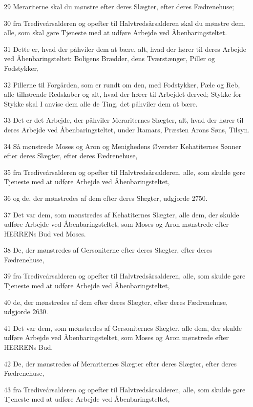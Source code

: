\par 29 Merariterne skal du mønstre efter deres Slægter, efter deres Fædrenehuse;
\par 30 fra Trediveårsalderen og opefter til Halvtredsårsalderen skal du mønstre dem, alle, som skal gøre Tjeneste med at udføre Arbejde ved Åbenbaringsteltet.
\par 31 Dette er, hvad der påhviler dem at bære, alt, hvad der hører til deres Arbejde ved Åbenbaringsteltet: Boligens Brædder, dens Tværstænger, Piller og Fodstykker,
\par 32 Pillerne til Forgården, som er rundt om den, med Fodstykker, Pæle og Reb, alle tilhørende Redskaber og alt, hvad der hører til Arbejdet derved; Stykke for Stykke skal I anvise dem alle de Ting, det påhviler dem at bære.
\par 33 Det er det Arbejde, der påhviler Merariternes Slægter, alt, hvad der hører til deres Arbejde ved Åbenbaringsteltet, under Itamars, Præsten Arons Søns, Tilsyn.
\par 34 Så mønstrede Moses og Aron og Menighedens Øverster Kehatiternes Sønner efter deres Slægter, efter deres Fædrenehuse,
\par 35 fra Trediveårsalderen og opefter til Halvtredsårsalderen, alle, som skulde gøre Tjeneste med at udføre Arbejde ved Åbenbaringsteltet,
\par 36 og de, der mønstredes af dem efter deres Slægter, udgjorde 2750.
\par 37 Det var dem, som mønstredes af Kehatiternes Slægter, alle dem, der skulde udføre Arbejde ved Åbenbaringsteltet, som Moses og Aron mønstrede efter HERRENs Bud ved Moses.
\par 38 De, der mønstredes af Gersoniterne efter deres Slægter, efter deres Fædrenehuse,
\par 39 fra Trediveårsalderen og opefter til Halvtredsårsalderen, alle, som skulde gøre Tjeneste med at udføre Arbejde ved Åbenbaringsteltet,
\par 40 de, der mønstredes af dem efter deres Slægter, efter deres Fædrenehuse, udgjorde 2630.
\par 41 Det var dem, som mønstredes af Gersoniternes Slægter, alle dem, der skulde udføre Arbejde ved Åbenbaringsteltet, som Moses og Aron mønstrede efter HERRENs Bud.
\par 42 De, der mønstredes af Merariternes Slægter efter deres Slægter, efter deres Fædrenehuse,
\par 43 fra Trediveårsalderen og opefter til Halvtredsårsalderen, alle, som skulde gøre Tjeneste med at udføre Arbejde ved Åbenbaringsteltet,
